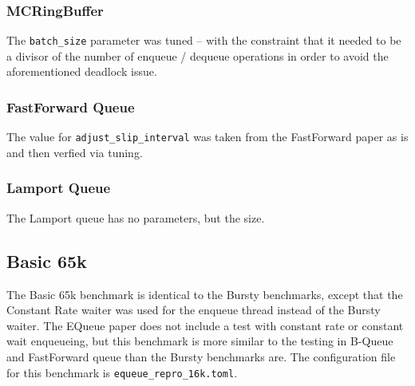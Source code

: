 \subsubsection*{MCRingBuffer}
The \texttt{batch\_size} parameter was tuned -- with the constraint that it needed to be a divisor of the
number of enqueue / dequeue operations in order to avoid the aforementioned deadlock issue.

\subsubsection*{FastForward Queue}
The value for \texttt{adjust\_slip\_interval} was taken from the FastForward paper as is and then verfied via tuning.

\subsubsection*{Lamport Queue}
The Lamport queue has no parameters, but the size.

\subsection{Basic 65k}
The Basic 65k benchmark is identical to the Bursty benchmarks, except that the Constant Rate waiter was used
for the enqueue thread instead of the Bursty waiter.
The EQueue paper does not include a test with constant rate or constant wait enqueueing, but this
benchmark is more similar to the testing in B-Queue and FastForward queue than the Bursty benchmarks are.
The configuration file for this benchmark is \texttt{equeue\_repro\_16k.toml}.
